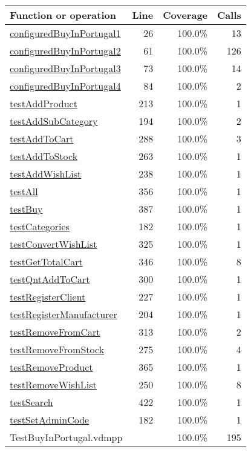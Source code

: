 \begin{longtable}{|l|r|r|r|}
\hline
Function or operation & Line & Coverage & Calls \\
\hline
\hline
\hyperref[configuredBuyInPortugal1:26]{configuredBuyInPortugal1} & 26&100.0\% & 13 \\
\hline
\hyperref[configuredBuyInPortugal2:61]{configuredBuyInPortugal2} & 61&100.0\% & 126 \\
\hline
\hyperref[configuredBuyInPortugal3:73]{configuredBuyInPortugal3} & 73&100.0\% & 14 \\
\hline
\hyperref[configuredBuyInPortugal4:84]{configuredBuyInPortugal4} & 84&100.0\% & 2 \\
\hline
\hyperref[testAddProduct:213]{testAddProduct} & 213&100.0\% & 1 \\
\hline
\hyperref[testAddSubCategory:194]{testAddSubCategory} & 194&100.0\% & 2 \\
\hline
\hyperref[testAddToCart:288]{testAddToCart} & 288&100.0\% & 3 \\
\hline
\hyperref[testAddToStock:263]{testAddToStock} & 263&100.0\% & 1 \\
\hline
\hyperref[testAddWishList:238]{testAddWishList} & 238&100.0\% & 1 \\
\hline
\hyperref[testAll:356]{testAll} & 356&100.0\% & 1 \\
\hline
\hyperref[testBuy:387]{testBuy} & 387&100.0\% & 1 \\
\hline
\hyperref[testCategories:182]{testCategories} & 182&100.0\% & 1 \\
\hline
\hyperref[testConvertWishList:325]{testConvertWishList} & 325&100.0\% & 1 \\
\hline
\hyperref[testGetTotalCart:346]{testGetTotalCart} & 346&100.0\% & 8 \\
\hline
\hyperref[testQntAddToCart:300]{testQntAddToCart} & 300&100.0\% & 1 \\
\hline
\hyperref[testRegisterClient:227]{testRegisterClient} & 227&100.0\% & 1 \\
\hline
\hyperref[testRegisterManufacturer:204]{testRegisterManufacturer} & 204&100.0\% & 1 \\
\hline
\hyperref[testRemoveFromCart:313]{testRemoveFromCart} & 313&100.0\% & 2 \\
\hline
\hyperref[testRemoveFromStock:275]{testRemoveFromStock} & 275&100.0\% & 4 \\
\hline
\hyperref[testRemoveProduct:365]{testRemoveProduct} & 365&100.0\% & 1 \\
\hline
\hyperref[testRemoveWishList:250]{testRemoveWishList} & 250&100.0\% & 8 \\
\hline
\hyperref[testSearch:422]{testSearch} & 422&100.0\% & 1 \\
\hline
\hyperref[testSetAdminCode:182]{testSetAdminCode} & 182&100.0\% & 1 \\
\hline
\hline
TestBuyInPortugal.vdmpp & & 100.0\% & 195 \\
\hline
\end{longtable}

